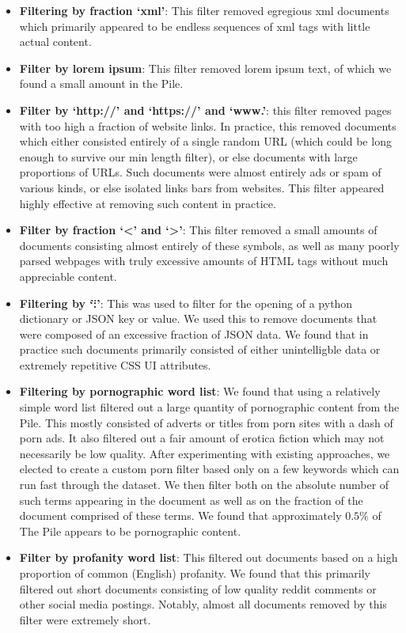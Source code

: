 \documentclass{article}
\begin{document}
\begin{itemize}
    \item \textbf{Filtering by fraction `xml'}: This filter removed egregious xml documents which primarily appeared to be endless sequences of xml tags with little actual content.
    \item \textbf{Filter by lorem ipsum}: This filter removed lorem ipsum text, of which we found a small amount in the Pile.
    \item \textbf{Filter by `http://' and `https://' and `www.'}: this filter removed pages with too high a fraction of website links. In practice, this removed documents which either consisted entirely of a single random URL (which could be long enough to survive our min length filter), or else documents with large proportions of URLs. Such documents were almost entirely ads or spam of various kinds, or else isolated links bars from websites. This filter appeared highly effective at removing such content in practice.
    \item \textbf{Filter by fraction `<' and `>'}: This filter removed a small amounts of documents consisting almost entirely of these symbols, as well as many poorly parsed webpages with truly excessive amounts of HTML tags without much appreciable content.
    \item \textbf{Filtering by `\":'}: This was used to filter for the opening of a python dictionary or JSON key or value. We used this to remove documents that were composed of an excessive fraction of JSON data. We found that in practice such documents primarily consisted of either unintelligble data or extremely repetitive CSS UI attributes.
    \item \textbf{Filtering by pornographic word list}: We found that using a relatively simple word list filtered out a large quantity of pornographic content from the Pile. This mostly consisted of adverts or titles from porn sites with a dash of porn ads. It also filtered out a fair amount of erotica fiction which may not necessarily be low quality. After experimenting with existing approaches, we elected to create a custom porn filter based only on a few keywords which can run fast through the dataset. We then filter both on the absolute number of such terms appearing in the document as well as on the fraction of the document comprised of these terms. We found that approximately $0.5\%$ of The Pile appears to be pornographic content.
    \item \textbf{Filter by profanity word list}: This filtered out documents based on a high proportion of common (English) profanity. We found that this primarily filtered out short documents consisting of low quality reddit comments or other social media postings. Notably, almost all documents removed by this filter were extremely short.

\end{itemize}
\end{document}
